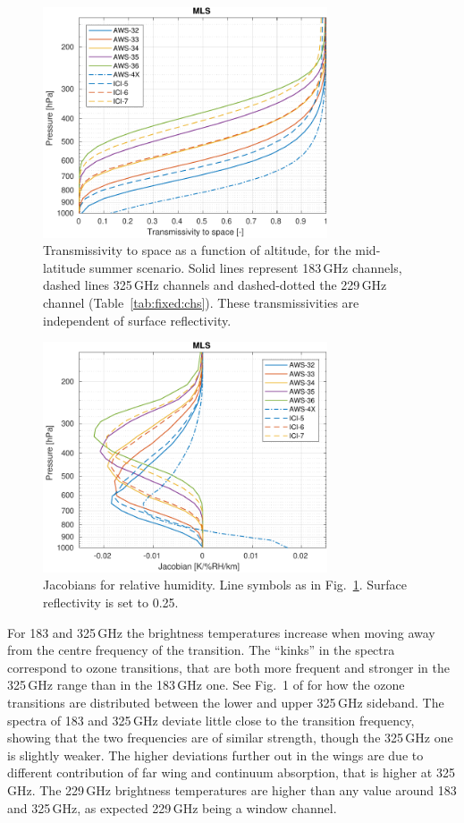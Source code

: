 \documentclass[12pt]{article}
\begin{document}
\begin{figure}[p]
  \centering
  \includegraphics[width=0.75\textwidth]{fascod_tr_mls}
  \caption{Transmissivity to space as a function of altitude, for the
    mid-latitude summer scenario. Solid lines represent 183\,GHz channels,
    dashed lines 325\,GHz channels and dashed-dotted the 229\,GHz channel
    (Table~\ref{tab:fixed:chs}). These transmissivities are independent of
    surface reflectivity.}
  \label{fig:tr:mls}
\end{figure}
\begin{figure}[p]
  \centering
  \includegraphics[width=0.75\textwidth]{fascod_wf_mls_025}
  \caption{Jacobians for relative humidity. Line symbols as in Fig.~\ref{fig:tr:mls}.
    Surface reflectivity is set to 0.25.}
  \label{fig:wf:mls:025}
\end{figure}

For 183 and 325\,GHz the brightness temperatures increase when moving away from
the centre frequency of the transition. The ``kinks'' in the spectra correspond
to ozone transitions, that are both more frequent and stronger in the 325\,GHz
range than in the 183\,GHz one. See Fig.~1 of \citet{eriksson:towar:20} for how
the ozone transitions are distributed between the lower and upper 325\,GHz
sideband. The spectra of 183 and 325\,GHz deviate little close to the transition
frequency, showing that the two frequencies are of similar strength, though the
325\,GHz one is slightly weaker. The higher deviations further out in the wings
are due to different contribution of far wing and continuum absorption, that is
higher at 325\,GHz. The 229\,GHz brightness temperatures are higher than any
value around 183 and 325\,GHz, as expected 229\,GHz being a window channel.
\end{document}
